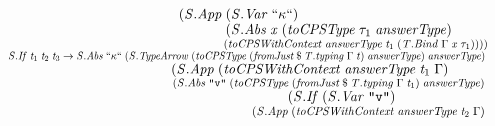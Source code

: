 \documentclass[10pt]{article}
\newcommand{\Conid}[1]{\mathit{#1}}
\newcommand{\Varid}[1]{\mathit{#1}}
\begin{document}
\begin{hscode}
${\hskip1.00em\relax\hskip1.00em\relax\phantom{\Conid{\Conid{S}.Abs}\;\Varid{x}\;\tau_{1}\;\Varid{t}_{1}\to \Conid{\Conid{S}.Abs}\;\text{``}\kappa\text{``}\;\mbox{}}(\Conid{\Conid{S}.App}\;(\Conid{\Conid{S}.Var}\;\text{``}\kappa\text{``})\;}$\\
${\hskip1.00em\relax\hskip1.00em\relax\phantom{\Conid{\Conid{S}.Abs}\;\Varid{x}\;\tau_{1}\;\Varid{t}_{1}\to \Conid{\Conid{S}.Abs}\;\text{``}\kappa\text{``}\;\mbox{}}\phantom{(\Conid{\Conid{S}.App}\;\mbox{}}(\Conid{\Conid{S}.Abs}\;\Varid{x}\;(\Varid{toCPSType}\;\tau_{1}\;\Varid{answerType})\;}$\\
${\hskip1.00em\relax\hskip1.00em\relax\phantom{\Conid{\Conid{S}.Abs}\;\Varid{x}\;\tau_{1}\;\Varid{t}_{1}\to \Conid{\Conid{S}.Abs}\;\text{``}\kappa\text{``}\;\mbox{}}\phantom{(\Conid{\Conid{S}.App}\;\mbox{}}\phantom{(\Conid{\Conid{S}.Abs}\;\Varid{x}\;\mbox{}}(\Varid{toCPSWithContext}\;\Varid{answerType}\;\Varid{t}_{1}\;(\Conid{\Conid{T}.Bind}\;\Gamma\;\Varid{x}\;\tau_{1}))))}$\\
${\hskip1.00em\relax\hskip1.00em\relax\Conid{\Conid{S}.If}\;\Varid{t}_{1}\;\Varid{t}_{2}\;\Varid{t}_{3}\to \Conid{\Conid{S}.Abs}\;\text{``}\kappa\text{``}\;(\Conid{\Conid{S}.TypeArrow}\;(\Varid{toCPSType}\;(\Varid{fromJust}\mathbin{\$}\Varid{\Conid{T}.typing}\;\Gamma\;\Varid{t})\;\Varid{answerType})\;\Varid{answerType})\;}$\\
${\hskip1.00em\relax\hskip1.00em\relax\phantom{\Conid{\Conid{S}.If}\;\Varid{t}_{1}\;\Varid{t}_{2}\;\Varid{t}_{3}\to \Conid{\Conid{S}.Abs}\;\text{``}\kappa\text{``}\;\mbox{}}(\Conid{\Conid{S}.App}\;(\Varid{toCPSWithContext}\;\Varid{answerType}\;\Varid{t}_{1}\;\Gamma)\;}$\\
${\hskip1.00em\relax\hskip1.00em\relax\phantom{\Conid{\Conid{S}.If}\;\Varid{t}_{1}\;\Varid{t}_{2}\;\Varid{t}_{3}\to \Conid{\Conid{S}.Abs}\;\text{``}\kappa\text{``}\;\mbox{}}\phantom{(\Conid{\Conid{S}.App}\;\mbox{}}(\Conid{\Conid{S}.Abs}\;\text{\tt \char34 v\char34}\;(\Varid{toCPSType}\;(\Varid{fromJust}\mathbin{\$}\Varid{\Conid{T}.typing}\;\Gamma\;\Varid{t}_{1})\;\Varid{answerType})\;}$\\
${\hskip1.00em\relax\hskip1.00em\relax\phantom{\Conid{\Conid{S}.If}\;\Varid{t}_{1}\;\Varid{t}_{2}\;\Varid{t}_{3}\to \Conid{\Conid{S}.Abs}\;\text{``}\kappa\text{``}\;\mbox{}}\phantom{(\Conid{\Conid{S}.App}\;\mbox{}}\phantom{(\Conid{\Conid{S}.Abs}\;\text{\tt \char34 v\char34}\;\mbox{}}(\Conid{\Conid{S}.If}\;(\Conid{\Conid{S}.Var}\;\text{\tt \char34 v\char34})\;}$\\
${\hskip1.00em\relax\hskip1.00em\relax\phantom{\Conid{\Conid{S}.If}\;\Varid{t}_{1}\;\Varid{t}_{2}\;\Varid{t}_{3}\to \Conid{\Conid{S}.Abs}\;\text{``}\kappa\text{``}\;\mbox{}}\phantom{(\Conid{\Conid{S}.App}\;\mbox{}}\phantom{(\Conid{\Conid{S}.Abs}\;\text{\tt \char34 v\char34}\;\mbox{}}\hskip1.00em\relax(\Conid{\Conid{S}.App}\;(\Varid{toCPSWithContext}\;\Varid{answerType}\;\Varid{t}_{2}\;\Gamma)\;}$\\

\end{hscode}
\end{document}
